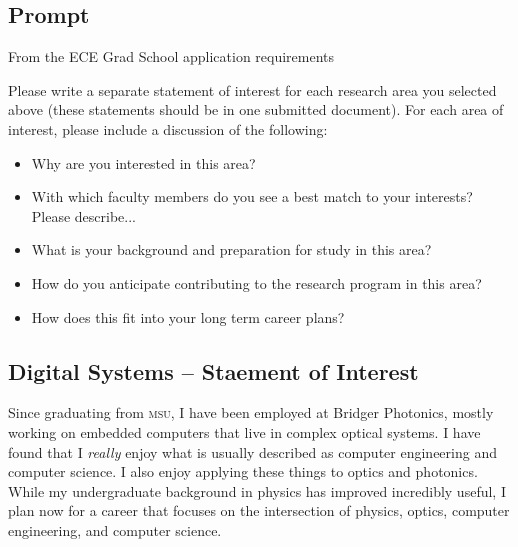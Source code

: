 \documentclass{article}
\author{Nelson Goldsworth}
\date{\today}
\begin{document}
\subsection*{Prompt}

From the ECE Grad School application requirements

\begin{displayquote}
\ttfamily
 Please write a separate statement of interest for each research area you selected above (these statements should be in one submitted document). For each area of interest, please include a discussion of the following:
\begin{itemize}
    \item Why are you interested in this area?
    \item With which faculty members do you see a best match to your interests? Please describe...
    \item What is your background and preparation for study in this area?
    \item How do you anticipate contributing to the research program in this area?
    \item How does this fit into your long term career plans?
    \end{itemize}
\end{displayquote}

\newpage
\subsection*{Digital Systems -- Staement of Interest}

Since graduating from \textsc{msu}, I have been employed at Bridger Photonics, mostly working on embedded computers that live in complex optical systems.
I have found that I \textit{really} enjoy what is usually described as computer engineering and computer science. I also enjoy applying these things to optics and photonics. 
While my undergraduate background in physics has improved incredibly useful, I plan now for a career that focuses on the intersection of physics, optics, computer engineering, and computer science.
\end{document}
